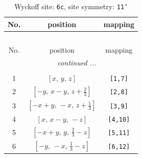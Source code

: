 \documentclass[fleqn,8pt]{jsarticle}
\begin{document}
\renewcommand{\arraystretch}{1.2}
\begin{longtable}{ccc}
\caption{Wyckoff site: {\tt 6c}, site symmetry: {\tt 11'}}
 \\
 \hline \hline
No. & position & mapping \\ \hline \endfirsthead

\multicolumn{2}{l}{\tablename\ \thetable{}} \\
 \hline \hline
No. & position & mapping \\ \hline \endhead

 \hline \hline
\multicolumn{2}{r}{\footnotesize\it continued ...} \\ \endfoot

 \hline \hline
\multicolumn{2}{r}{} \\ \endlastfoot

1 & $\left[ x,\, y,\, z \right]$ & {\tt [1,7]} \\ \hline
2 & $\left[ - y,\, x - y,\, z + \frac{2}{3} \right]$ & {\tt [2,8]} \\ \hline
3 & $\left[ - x + y,\, - x,\, z + \frac{1}{3} \right]$ & {\tt [3,9]} \\ \hline
4 & $\left[ x,\, x - y,\, - z \right]$ & {\tt [4,10]} \\ \hline
5 & $\left[ - x + y,\, y,\, \frac{2}{3} - z \right]$ & {\tt [5,11]} \\ \hline
6 & $\left[ - y,\, - x,\, \frac{1}{3} - z \right]$ & {\tt [6,12]} \\
\end{longtable}
\end{document}
